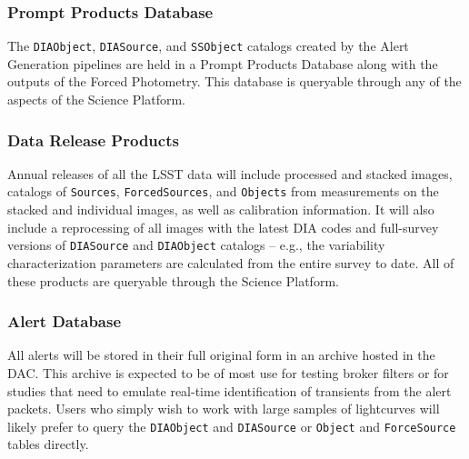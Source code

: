 \subsubsection{Prompt Products Database} \label{sec:ppdb}

The \texttt{DIAObject}, \texttt{DIASource}, and \texttt{SSObject} catalogs created by the Alert Generation pipelines are held in a Prompt Products Database along with the outputs of the Forced Photometry.
This database is queryable through any of the aspects of the Science Platform.


\subsubsection{Data Release Products} \label{sec:drp}

Annual releases of all the LSST data will include processed and stacked images, catalogs of {\tt Sources}, {\tt ForcedSources}, and {\tt Objects} from measurements on the stacked and individual images, as well as calibration information.
It will also include a  reprocessing of all images with the latest DIA codes and full-survey versions of {\tt DIASource} and {\tt DIAObject} catalogs -- e.g., the variability characterization parameters are calculated from the entire survey to date.
All of these products are queryable through the Science Platform.

\subsubsection{Alert Database} \label{sec:alertdb}

All alerts will be stored in their full original form in an archive hosted in the DAC.
This archive is expected to be of most use for testing broker filters or for studies that need to emulate real-time identification of transients from the alert packets.
Users who simply wish to work with large samples of lightcurves will likely prefer to query the \texttt{DIAObject} and \texttt{DIASource} or \texttt{Object} and \texttt{ForceSource} tables directly.

